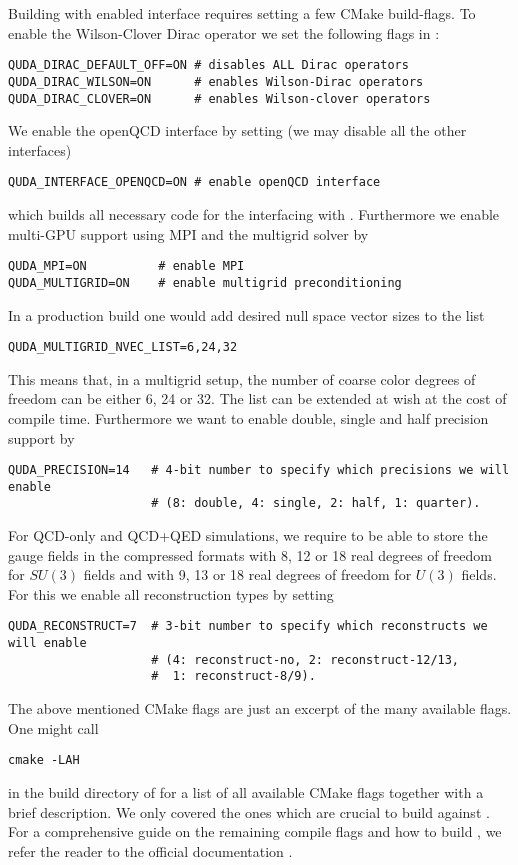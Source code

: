 Building \quda with enabled \openqxd interface requires setting a few CMake build-flags. To enable the Wilson-Clover Dirac operator we set the following flags in  \cite{QUDApaper}:
\begin{verbatim}
QUDA_DIRAC_DEFAULT_OFF=ON # disables ALL Dirac operators
QUDA_DIRAC_WILSON=ON      # enables Wilson-Dirac operators
QUDA_DIRAC_CLOVER=ON      # enables Wilson-clover operators
\end{verbatim}
We enable the openQCD interface by setting (we may disable all the other interfaces)
\begin{verbatim}
QUDA_INTERFACE_OPENQCD=ON # enable openQCD interface
\end{verbatim}
which builds all necessary code for the interfacing with \openqxd. Furthermore we enable multi-GPU support using MPI and the multigrid solver by
\begin{verbatim}
QUDA_MPI=ON          # enable MPI
QUDA_MULTIGRID=ON    # enable multigrid preconditioning
\end{verbatim}
In a production build one would add desired null space vector sizes to the list
\begin{verbatim}
QUDA_MULTIGRID_NVEC_LIST=6,24,32
\end{verbatim}
This means that, in a multigrid setup, the number of coarse color degrees of freedom can be either 6, 24 or 32. The list can be extended at wish at the cost of compile time. Furthermore we want to enable double, single and half precision support by
\begin{verbatim}
QUDA_PRECISION=14   # 4-bit number to specify which precisions we will enable
                    # (8: double, 4: single, 2: half, 1: quarter).
\end{verbatim}
For QCD-only and QCD+QED simulations, we require \quda to be able to store the gauge fields in the compressed formats with 8, 12 or 18 real degrees of freedom for $SU(3)$ fields and with 9, 13 or 18 real degrees of freedom for $U(3)$ fields. For this we enable all reconstruction types by setting
\begin{verbatim}
QUDA_RECONSTRUCT=7  # 3-bit number to specify which reconstructs we will enable
                    # (4: reconstruct-no, 2: reconstruct-12/13, 
                    #  1: reconstruct-8/9).
\end{verbatim}
The above mentioned CMake flags are just an excerpt of the many available flags. One might call
\begin{verbatim}
cmake -LAH
\end{verbatim}
in the build directory of \quda for a list of all available CMake flags together with a brief description. We only covered the ones which are crucial to build \openqxd against \quda. For a comprehensive guide on the remaining compile flags and how to build \quda, we refer the reader to the official documentation \cite{github:quda}.

